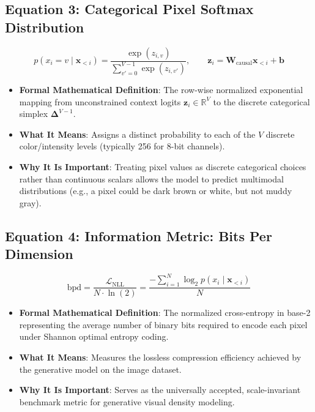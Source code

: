 \documentclass[11pt,a4paper]{article}
\theoremstyle{definition}
\begin{document}
\subsection{\textbf{Equation 3: Categorical Pixel Softmax Distribution}}
{\boldmath
\begin{equation}
p(x_i = v \mid \mathbf{x}_{<i}) = \frac{\exp(z_{i, v})}{\sum_{v'=0}^{V-1} \exp(z_{i, v'})}, \qquad \mathbf{z}_i = \mathbf{W}_{\text{causal}} \mathbf{x}_{<i} + \mathbf{b}
\end{equation}
}
\begin{itemize}
    \item \textbf{Formal Mathematical Definition}:
    The row-wise normalized exponential mapping from unconstrained context logits $\mathbf{z}_i \in \mathbb{R}^V$ to the discrete categorical simplex $\boldsymbol{\Delta}^{V-1}$.
    \item \textbf{What It Means}:
    Assigns a distinct probability to each of the $V$ discrete color/intensity levels (typically 256 for 8-bit channels).
    \item \textbf{Why It Is Important}:
    Treating pixel values as discrete categorical choices rather than continuous scalars allows the model to predict multimodal distributions (e.g., a pixel could be dark brown or white, but not muddy gray).
\end{itemize}

\subsection{\textbf{Equation 4: Information Metric: Bits Per Dimension}}
{\boldmath
\begin{equation}
\text{bpd} = \frac{\mathcal{L}_{\text{NLL}}}{N \cdot \ln(2)} = \frac{-\sum_{i=1}^N \log_2 p(x_i \mid \mathbf{x}_{<i})}{N}
\end{equation}
}
\begin{itemize}
    \item \textbf{Formal Mathematical Definition}:
    The normalized cross-entropy in base-2 representing the average number of binary bits required to encode each pixel under Shannon optimal entropy coding.
    \item \textbf{What It Means}:
    Measures the lossless compression efficiency achieved by the generative model on the image dataset.
    \item \textbf{Why It Is Important}:
    Serves as the universally accepted, scale-invariant benchmark metric for generative visual density modeling.
\end{itemize}
\end{document}

